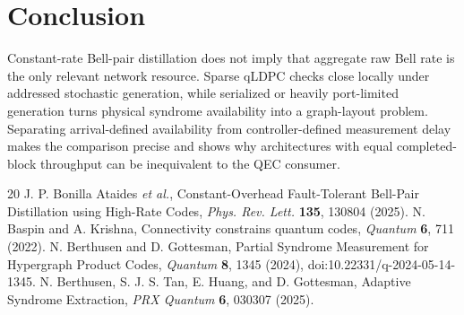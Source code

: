 \documentclass[aps,prx,reprint,superscriptaddress,nofootinbib,longbibliography,floatfix]{revtex4-2}
\begin{document}
\section{Conclusion}
Constant-rate Bell-pair distillation does not imply that aggregate raw Bell rate is the only relevant network resource. Sparse qLDPC checks close locally under addressed stochastic generation, while serialized or heavily port-limited generation turns physical syndrome availability into a graph-layout problem. Separating arrival-defined availability from controller-defined measurement delay makes the comparison precise and shows why architectures with equal completed-block throughput can be inequivalent to the QEC consumer.

\begin{thebibliography}{20}
 J. P. Bonilla Ataides \emph{et al.}, Constant-Overhead Fault-Tolerant Bell-Pair Distillation using High-Rate Codes, \emph{Phys. Rev. Lett.} \textbf{135}, 130804 (2025).
 N. Baspin and A. Krishna, Connectivity constrains quantum codes, \emph{Quantum} \textbf{6}, 711 (2022).
 N. Berthusen and D. Gottesman, Partial Syndrome Measurement for Hypergraph Product Codes, \emph{Quantum} \textbf{8}, 1345 (2024), doi:10.22331/q-2024-05-14-1345.
 N. Berthusen, S. J. S. Tan, E. Huang, and D. Gottesman, Adaptive Syndrome Extraction, \emph{PRX Quantum} \textbf{6}, 030307 (2025).
\end{thebibliography}
\end{document}
